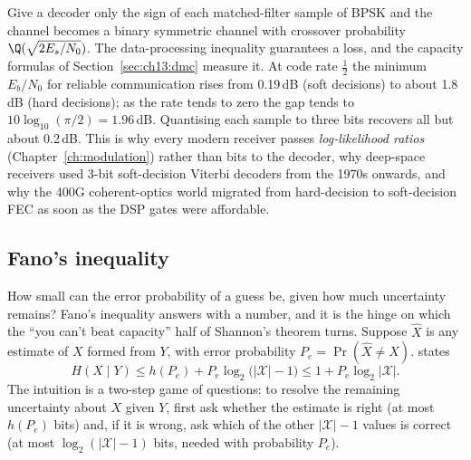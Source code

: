 \begin{inpractice}
Give a decoder only the sign of each matched-filter sample of BPSK and the channel becomes a
binary symmetric channel with crossover probability $\Q(\sqrt{2E_s/N_0})$. The data-processing
inequality guarantees a loss, and the capacity formulas of Section~\ref{sec:ch13:dmc} measure it.
At code rate $\frac12$ the minimum $E_b/N_0$ for reliable communication rises from 0.19\,dB (soft
decisions) to about 1.8\,dB (hard decisions); as the rate tends to zero the gap tends to
$10\log_{10}(\pi/2)=1.96$\,dB. Quantising each sample to three bits recovers all but about 0.2\,dB.
This is why every modern receiver passes \emph{log-likelihood ratios} (Chapter~\ref{ch:modulation})
rather than bits to the decoder, why deep-space receivers used 3-bit soft-decision Viterbi
decoders from the 1970s onwards, and why the 400G coherent-optics world migrated from
hard-decision to soft-decision FEC as soon as the DSP gates were affordable.
\end{inpractice}

\subsection{Fano's inequality}

How small can the error probability of a guess be, given how much uncertainty remains? Fano's
inequality answers with a number, and it is the hinge on which the ``you can't beat capacity''
half of Shannon's theorem turns. Suppose $\hat X$ is any estimate of $X$ formed from $Y$, with
error probability $P_e=\Pr(\hat X\ne X)$.  states
\begin{equation}
H(X\mid Y)\le h(P_e)+P_e\log_2\big(|\mathcal{X}|-1\big)\le1+P_e\log_2|\mathcal{X}|.
\label{eq:ch13:fano}
\end{equation}
The intuition is a two-step game of questions: to resolve the remaining uncertainty about $X$
given $Y$, first ask whether the estimate is right (at most $h(P_e)$ bits) and, if it is wrong,
ask which of the other $|\mathcal{X}|-1$ values is correct (at most $\log_2(|\mathcal{X}|-1)$ bits,
needed with probability $P_e$).


